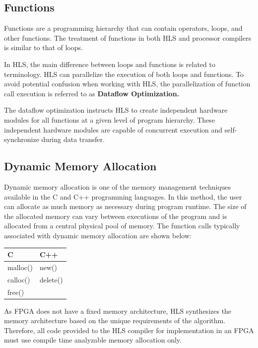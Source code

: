 \subsection{Functions}
  Functions are a programming hierarchy that can contain operators, loops, and other functions. The treatment of functions in both HLS and processor compilers is similar to that
  of loops.

  \par In HLS, the main difference between loops and functions is related to terminology. HLS can parallelize the execution of both loops and functions. To avoid potential confusion when working with HLS, the parallelization
  of function call execution is referred to as \textbf{Dataflow Optimization.}

  The dataflow optimization instructs HLS to create independent hardware modules for all functions at a given level of program hierarchy. These independent hardware modules are capable of concurrent execution and self-synchronize during data transfer.

\subsection{Dynamic Memory Allocation}

Dynamic memory allocation is one of the memory management techniques available in the
C and C++ programming languages. In this method, the user can allocate as much memory
as necessary during program runtime. The size of the allocated memory can vary between
executions of the program and is allocated from a central physical pool of memory. The function calls typically
associated with dynamic memory allocation are shown below:

\begin{table}[H]
  \centering
  \begin{tabular}{|l|l|}
  \hline
  \textbf{C} & \textbf{C++}  \\ \hline
  malloc()   & new()\\ \hline
  calloc()   & delete()\\ \hline
  free()   &  \\ \hline
  \end{tabular}
\end{table} 

As FPGA does not have a fixed memory architecture, HLS synthesizes the memory architecture based on the unique requirements of the
algorithm. Therefore, all code provided to the HLS compiler for implementation in an FPGA
must use compile time analyzable memory allocation only.


